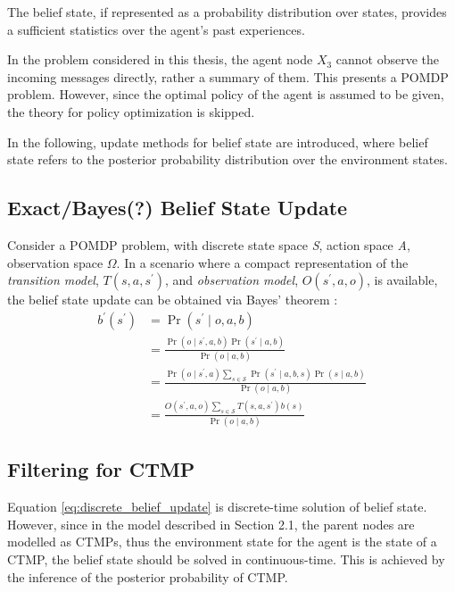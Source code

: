 The belief state, if represented as a probability distribution over states, provides a sufficient statistics over the agent's past experiences. 

In the problem considered in this thesis, the agent node $ X_{3} $ cannot observe the incoming messages directly, rather a summary of them. This presents a POMDP problem. However, since the optimal policy of the agent is assumed to be given, the theory for policy optimization is skipped. 

In the following, update methods for belief state are introduced, where belief state refers to the posterior probability distribution over the environment states.

\subsection{Exact/Bayes(?) Belief State Update}
\label{sec:exact_update}
Consider a POMDP problem, with discrete state space \textit{S}, action space \textit{A}, observation space $ \Omega $. In a scenario where a compact representation of the \textit{transition model}, $ T(s, a, s^{\prime})$,  and \textit{observation model}, $ O(s^{\prime}, a, o) $, is available, the belief state update can be obtained via Bayes' theorem \cite{KAELBLING199899}:
\begin{align}
b^{\prime}\left(s^{\prime}\right) &=\operatorname{Pr}\left(s^{\prime} \mid o, a, b\right) \nonumber\\
&=\frac{\operatorname{Pr}\left(o \mid s^{\prime}, a, b\right) \operatorname{Pr}\left(s^{\prime} \mid a, b\right)}{\operatorname{Pr}(o \mid a, b)} \nonumber\\
&=\frac{\operatorname{Pr}\left(o \mid s^{\prime}, a\right) \sum_{s \in \mathcal{S}} \operatorname{Pr}\left(s^{\prime} \mid a, b, s\right) \operatorname{Pr}(s \mid a, b)}{\operatorname{Pr}(o \mid a, b)} \nonumber\\
&=\frac{O\left(s^{\prime}, a, o\right) \sum_{s \in \mathcal{S}} T\left(s,a, s^{\prime}\right) b(s)}{\operatorname{Pr}(o \mid a, b)}
\label{eq:discrete_belief_update}
\end{align}

\subsection{Filtering for CTMP}
\label{sec:filtering_CTMC}
Equation \ref{eq:discrete_belief_update} is discrete-time solution of belief state. However, since in the model described in Section 2.1, the parent nodes are modelled as CTMPs, thus the environment state for the agent is the state of a CTMP, the belief state should be solved in continuous-time. This is achieved by the inference of the posterior probability of CTMP. \cite{article}

